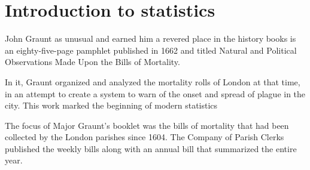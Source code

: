 \chapter{Introduction to statistics}
%



John Graunt as unusual and earned him a revered place in the history books is an eighty-five-page pamphlet published in 1662 and titled Natural and Political Observations Made Upon the Bills of Mortality.

In it, Graunt organized and analyzed the mortality rolls of London at that time, in an attempt to create a system to warn of the onset and spread of plague in the city. This work marked the beginning of modern statistics

The focus of Major Graunt’s booklet was the bills of mortality that had been collected by the London parishes since 1604. The Company of Parish Clerks published the weekly bills along with an annual bill that summarized the entire year.

